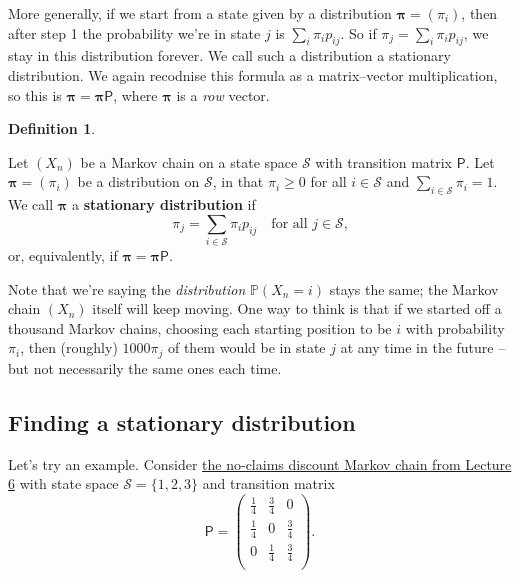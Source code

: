\documentclass[
  a4paper,
]{article}
\theoremstyle{definition}
\newtheorem{definition}{Definition}[section]
\theoremstyle{definition}
\theoremstyle{definition}
\theoremstyle{remark}
\begin{document}
More generally, if we start from a state given by a distribution \(\boldsymbol \pi = (\pi_i)\), then after step 1 the probability we're in state \(j\) is \(\sum_i \pi_i p_{ij}\). So if \(\pi_j = \sum_i \pi_i p_{ij}\), we stay in this distribution forever. We call such a distribution a stationary distribution. We again recodnise this formula as a matrix--vector multiplication, so this is \(\boldsymbol \pi = \boldsymbol \pi\mathsf P\), where \(\boldsymbol \pi\) is a \emph{row} vector.

\begin{definition}
\protect\hypertarget{def:unlabeled-div-12}{}\label{def:unlabeled-div-12}

Let \((X_n)\) be a Markov chain on a state space \(\mathcal S\) with transition matrix \(\mathsf P\).
Let \(\boldsymbol \pi = (\pi_i)\) be a distribution on \(\mathcal S\), in that \(\pi_i \geq 0\) for all \(i \in \mathcal S\) and \(\sum_{i \in \mathcal S} \pi_i = 1\). We call \(\boldsymbol \pi\) a \textbf{stationary distribution} if
\[ \pi_j = \sum_{i\in \mathcal S} \pi_i p_{ij} \quad \text{for all $j \in \mathcal S$,} \]
or, equivalently, if \(\boldsymbol \pi = \boldsymbol \pi\mathsf P\).

\end{definition}

Note that we're saying the \emph{distribution} \(\mathbb P(X_n = i)\) stays the same; the Markov chain \((X_n)\) itself will keep moving. One way to think is that if we started off a thousand Markov chains, choosing each starting position to be \(i\) with probability \(\pi_i\), then (roughly) \(1000 \pi_j\) of them would be in state \(j\) at any time in the future -- but not necessarily the same ones each time.

\hypertarget{find-stationary}{%
\subsection{Finding a stationary distribution}\label{find-stationary}}

Let's try an example. Consider \protect\hyperlink{S06-example1}{the no-claims discount Markov chain from Lecture 6} with state space \(\mathcal S=\{1,2,3\}\) and transition matrix
\[ \mathsf P =\begin{pmatrix}
    \tfrac14 &\tfrac34 & 0\\
    \tfrac14 &0 & \tfrac34\\
    0 &\tfrac14 & \tfrac34\\
    \end{pmatrix} .\]
\end{document}
